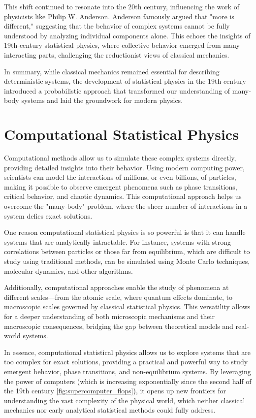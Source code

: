 \documentclass[ansiapaper]{report}
\begin{document}
\begin{multicols}{3}
  This shift continued to resonate into the 20th century, influencing the work of physicists like Philip W. Anderson. Anderson famously argued that "more is different," suggesting that the behavior of complex systems cannot be fully understood by analyzing individual components alone. This echoes the insights of 19th-century statistical physics, where collective behavior emerged from many interacting parts, challenging the reductionist views of classical mechanics.

  In summary, while classical mechanics remained essential for describing deterministic systems, the development of statistical physics in the 19th century introduced a probabilistic approach that transformed our understanding of many-body systems and laid the groundwork for modern physics.

  \section{Computational Statistical Physics}

  Computational methods allow us to simulate these complex systems directly, providing detailed insights into their behavior. Using modern computing power, scientists can model the interactions of millions, or even billions, of particles, making it possible to observe emergent phenomena such as phase transitions, critical behavior, and chaotic dynamics. This computational approach helps us overcome the "many-body" problem, where the sheer number of interactions in a system defies exact solutions.

  One reason computational statistical physics is so powerful is that it can handle systems that are analytically intractable. For instance, systems with strong correlations between particles or those far from equilibrium, which are difficult to study using traditional methods, can be simulated using Monte Carlo techniques, molecular dynamics, and other algorithms.

  Additionally, computational approaches enable the study of phenomena at different scales—from the atomic scale, where quantum effects dominate, to macroscopic scales governed by classical statistical physics. This versatility allows for a deeper understanding of both microscopic mechanisms and their macroscopic consequences, bridging the gap between theoretical models and real-world systems.

  In essence, computational statistical physics allows us to explore systems that are too complex for exact solutions, providing a practical and powerful way to study emergent behavior, phase transitions, and non-equilibrium systems. By leveraging the power of computers (which is increasing exponentially since the second half of the 19th century \cref{fig:supercomputer_flops}), it opens up new frontiers for understanding the vast complexity of the physical world, which neither classical mechanics nor early analytical statistical methods could fully address.


\end{multicols}
\end{document}
